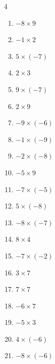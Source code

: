 \begin{multicols}{4}
\begin{enumerate}
  \item $-8\times 9$
        \phantom{$=-72$}

  \item $-1\times 2$
        \phantom{$=-2$}

  \item $5\times (-7)$
        \phantom{$=-35$}

  \item $2\times 3$
        \phantom{$=6$}

  \item $9\times (-7)$
        \phantom{$=-63$}

  \item $2\times 9$
        \phantom{$=18$}

  \item $-9\times (-6)$
        \phantom{$=54$}

  \item $-1\times (-9)$
        \phantom{$=9$}

  \item $-2\times (-8)$
        \phantom{$=16$}

  \item $-5\times 9$
        \phantom{$=-45$}

  \item $-7\times (-5)$
        \phantom{$=35$}

  \item $5\times (-8)$
        \phantom{$=-40$}

  \item $-8\times (-7)$
        \phantom{$=56$}

  \item $8\times 4$
        \phantom{$=32$}

  \item $-7\times (-2)$
        \phantom{$=14$}

  \item $3\times 7$
        \phantom{$=21$}

  \item $7\times 7$
        \phantom{$=49$}

  \item $-6\times 7$
        \phantom{$=-42$}

  \item $-5\times 3$
        \phantom{$=-15$}

  \item $4\times (-6)$
        \phantom{$=-24$}

  \item $-8\times (-6)$
        \phantom{$=48$}


\end{enumerate}
\end{multicols}
